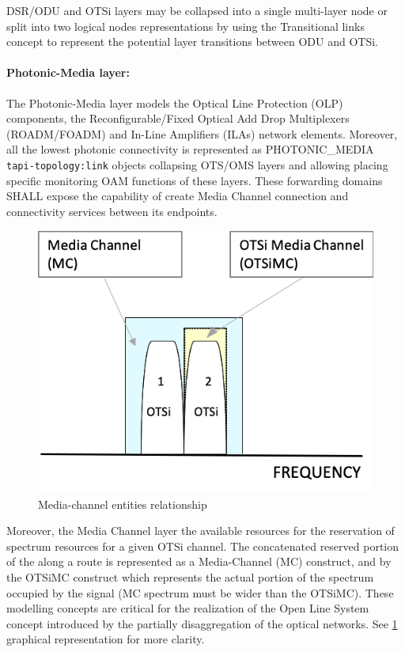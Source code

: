 \documentclass[a4paper,fleqn]{cas-dc}
\begin{document}
DSR/ODU and OTSi layers may be collapsed into a single multi-layer node or split into two logical nodes representations by using the Transitional links concept to represent the potential layer transitions between ODU and OTSi.

\paragraph{Photonic-Media layer:}
The Photonic-Media layer models the Optical Line Protection  (OLP) components, the Reconfigurable/Fixed Optical Add Drop Multiplexers (ROADM/FOADM) and In-Line Amplifiers (ILAs) network elements. Moreover, all the lowest photonic connectivity is represented as PHOTONIC\_MEDIA \texttt{tapi-topology:link} objects collapsing OTS/OMS layers and allowing placing specific monitoring OAM functions of these layers. These forwarding domains SHALL expose the capability of create Media Channel connection and connectivity services between its endpoints.

\begin{figure}
	\centering
		\includegraphics[scale=0.75]{figs/Media_channel.png}
	\caption{Media-channel entities relationship}
	\label{FIG:Media_channel}
\end{figure}

Moreover, the Media Channel layer the available resources for the reservation of  spectrum resources for a given OTSi channel. The concatenated reserved portion of the along a route is represented as a Media-Channel (MC) construct, and by the OTSiMC construct which represents the actual portion of the spectrum occupied by the signal (MC spectrum must be wider than the OTSiMC). These modelling concepts are critical for the realization of the Open Line System concept introduced by the partially disaggregation of the optical networks. See \cref{FIG:Media_channel} graphical representation for more clarity.
\end{document}
